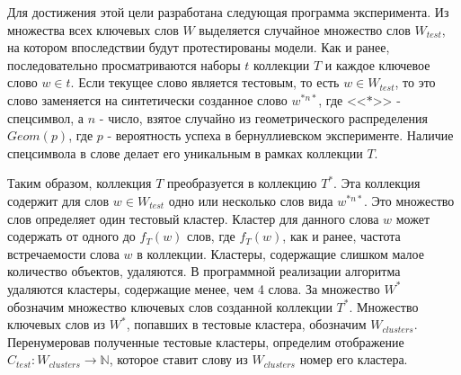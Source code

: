 Для достижения этой цели разработана следующая программа эксперимента. Из множества всех ключевых слов $W$ выделяется случайное множество слов $W_{test}$, на котором впоследствии будут протестированы модели. Как и ранее, последовательно просматриваются наборы $t$ коллекции $T$ и каждое ключевое слово $w \in t$. Если текущее слово является тестовым, то есть $w \in W_{test}$, то это слово заменяется на синтетически созданное слово $w^{*n*}$, где <<$*$>> - спецсимвол, а $n$ - число, взятое случайно из геометрического распределения $Geom(p)$, где $p$ - вероятность успеха в бернуллиевском эксперименте. Наличие спецсимвола в слове делает его уникальным в рамках коллекции $T$.

Таким образом, коллекция $T$ преобразуется в коллекцию $T^*$. Эта коллекция содержит для слов  $w \in W_{test}$ одно или несколько слов вида $w^{*n*}$. Это множество слов определяет один тестовый кластер. Кластер для данного слова $w$ может содержать от одного до $f_T(w)$ слов, где $f_T(w)$, как и ранее, частота встречаемости слова $w$ в коллекции. Кластеры, содержащие слишком малое количество объектов, удаляются. В программной реализации алгоритма удаляются кластеры, содержащие менее, чем 4 слова. За множество $W^*$ обозначим множество ключевых слов созданной коллекции $T^*$. Множество ключевых слов из $W^*$, попавших в тестовые кластера, обозначим $W_{clusters}$. Перенумеровав полученные тестовые кластеры, определим отображение $C_{test}: W_{clusters} \rightarrow \mathbb{N}$, которое ставит слову из $W_{clusters}$ номер его кластера.

